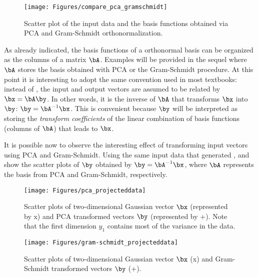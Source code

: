 \begin{figure}[!htb]
        \centering
                \texttt{[image: Figures/compare\_pca\_gramschmidt]}             
        \caption{Scatter plot of the input data and the basis functions obtained via PCA and Gram-Schmidt orthonormalization.\label{fig:compare_pca_gramschmidt}}
\end{figure}

As already indicated, the basis functions of a orthonormal basis can be organized as the columns of a matrix $\bA$. Examples will be provided in the sequel where $\bA$ stores the basis obtained with PCA or the Gram-Schmidt procedure.
At this point it is interesting to adopt the same convention used in most textbooks: instead of
, the input and output vectors are assumed to be related by $\bx = \bA \by$. In other words, it is the inverse of $\bA$ that transforms $\bx$ into $\by$: $\by = \bA^{-1} \bx$. This is convenient because $\by$ will be interpreted as storing the \emph{transform coefficients} of the linear combination of basis functions (columns of $\bA$) that leads to $\bx$.

It is possible now to observe the interesting effect of transforming input vectors using PCA and Gram-Schmidt.
Using the same input data that generated ,  and  show the scatter plots of $\by$ obtained by $\by=\bA^{-1} \bx$, where $\bA$ represents the basis from PCA and Gram-Schmidt, respectively.

\begin{figure}[!htb]
        \centering
                \texttt{[image: Figures/pca\_projecteddata]}
        \caption[{Scatter plots of two-dimensional Gaussian vector $\bx$ (represented by x) and PCA transformed vectors $\by$ (represented by +)}]{Scatter plots of two-dimensional Gaussian vector $\bx$ (represented by x) and PCA transformed vectors $\by$ (represented by +). Note that the first dimension $y_1$ contains most of the variance in the data.\label{fig:pca_projecteddata}}
\end{figure}

\begin{figure}[!htb]
        \centering
                \texttt{[image: Figures/gram-schmidt\_projecteddata]}          
        \caption{Scatter plots of two-dimensional Gaussian vector $\bx$ (x) and Gram-Schmidt transformed vectors $\by$ (+).\label{fig:gram-schmidt_projecteddata}}
\end{figure}


